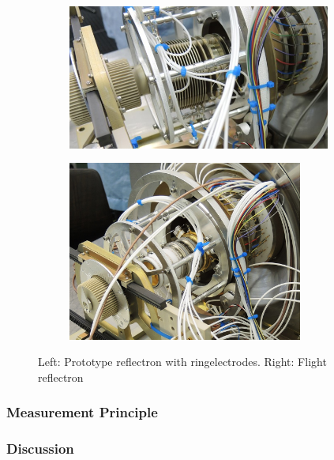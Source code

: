 	\begin{figure}[h]
		\begin{subfigure}{0.5\textwidth}
			\centering
			\includegraphics[width = 0.95\textwidth]{Bilder/reflectron_Prototype1.jpg}
		\end{subfigure}
		\begin{subfigure}{0.5\textwidth}
			\centering
			\includegraphics[width = 0.85\textwidth]{Bilder/reflectron_flight.JPG}
		\end{subfigure}
		\caption{Left: Prototype reflectron with ringelectrodes. Right: Flight reflectron}
		\label{fig:ExpRefl}
	\end{figure}

	\subsubsection{Measurement Principle}\label{subsec:ReflecMeasPric}
	
	\subsubsection{Discussion}\label{subsec:ReflecDissc}
	
